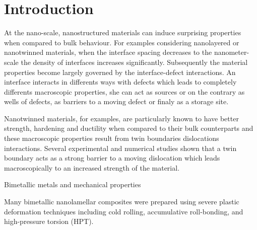 \documentclass[final,3p,times,twocolumn]{elsarticle}
\begin{document}
\section{Introduction}


At the nano-scale, nanostructured materials can induce surprising properties when compared to bulk behaviour. For examples considering nanolayered or nanotwinned materials, when the interface spacing decreases to the nanometer-scale the density of interfaces increases significantly. Subsequently the material properties become largely governed by the interface-defect interactions. An interface interacts in differents ways with defects which leads to completely differents macroscopic properties, she can act as sources or on the contrary as wells of defects, as barriers to a moving defect or finaly as a storage site.  

Nanotwinned materials, for examples, are particularly known to have better strength, hardening and ductility when compared to their bulk counterparts and these macroscopic properties result from twin boundaries dislocations interactions. Several experimental and numerical studies shown that a twin boundary acts as a strong barrier to a moving dislocation which leads macroscopically to an increased strength of the material.   

Bimetallic metals and mechanical properties

Many bimetallic nanolamellar composites were prepared using severe plastic deformation techniques including cold rolling, accumulative roll-bonding, and high-pressure torsion (HPT).
\end{document}
